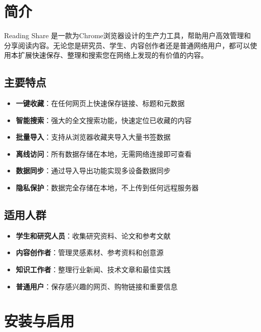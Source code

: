 \documentclass[10pt,a4paper]{article}
\begin{document}
\vspace{10pt}

\section{简介}

Reading Share 是一款为Chrome浏览器设计的生产力工具，帮助用户高效管理和分享阅读内容。无论您是研究员、学生、内容创作者还是普通网络用户，都可以使用本扩展快速保存、整理和搜索您在网络上发现的有价值的内容。

\subsection{主要特点}
\begin{itemize}
  \item \textbf{一键收藏}：在任何网页上快速保存链接、标题和元数据
  \item \textbf{智能搜索}：强大的全文搜索功能，快速定位已收藏的内容
  \item \textbf{批量导入}：支持从浏览器收藏夹导入大量书签数据
  \item \textbf{离线访问}：所有数据存储在本地，无需网络连接即可查看
  \item \textbf{数据同步}：通过导入导出功能实现多设备数据同步
  \item \textbf{隐私保护}：数据完全存储在本地，不上传到任何远程服务器
\end{itemize}

\subsection{适用人群}
\begin{itemize}
  \item \textbf{学生和研究人员}：收集研究资料、论文和参考文献
  \item \textbf{内容创作者}：管理灵感素材、参考资料和创意源
  \item \textbf{知识工作者}：整理行业新闻、技术文章和最佳实践
  \item \textbf{普通用户}：保存感兴趣的网页、购物链接和重要信息
\end{itemize}

\vspace{5pt}

\section{安装与启用}
\end{document}
